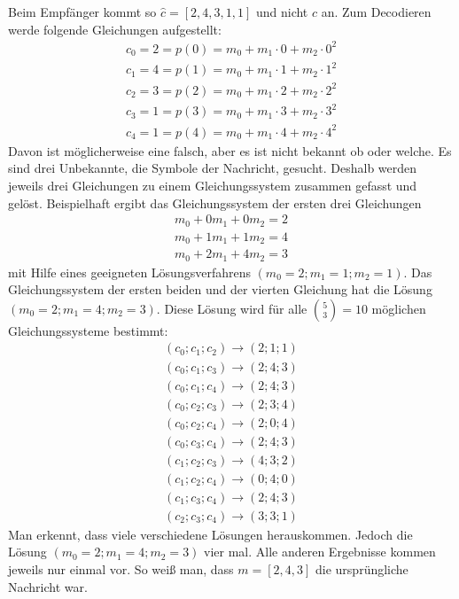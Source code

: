 Beim Empfänger kommt so $\hat{c}=[2,4,3,1,1]$ und nicht $c$ an.
Zum Decodieren werde folgende Gleichungen aufgestellt:
\begin{gather}
c_0=2=p(0)=m_0+m_1\cdot0+m_2\cdot0^2 \nonumber\\
c_1=4=p(1)=m_0+m_1\cdot1+m_2\cdot1^2 \nonumber\\
c_2=3=p(2)=m_0+m_1\cdot2+m_2\cdot2^2 \nonumber\\
c_3=1=p(3)=m_0+m_1\cdot3+m_2\cdot3^2 \nonumber\\
c_4=1=p(4)=m_0+m_1\cdot4+m_2\cdot4^2 \nonumber
\end{gather}
Davon ist möglicherweise eine falsch, aber es ist nicht bekannt ob oder welche.
Es sind drei Unbekannte, die Symbole der Nachricht, gesucht.
Deshalb werden jeweils drei Gleichungen zu einem Gleichungssystem zusammen gefasst und gelöst.
Beispielhaft ergibt das Gleichungssystem der ersten drei Gleichungen
\begin{gather}
m_0+0m_1+0m_2=2 \nonumber\\
m_0+1m_1+1m_2=4 \nonumber\\
m_0+2m_1+4m_2=3 \nonumber
\end{gather}
mit Hilfe eines geeigneten Lösungsverfahrens $(m_0=2; m_1=1; m_2=1)$.
Das Gleichungssystem der ersten beiden und der vierten Gleichung hat die Lösung $(m_0=2; m_1=4; m_2=3)$.
Diese Lösung wird für alle $\binom{5}{3}=10$ möglichen Gleichungssysteme bestimmt: 
\begin{gather}
(c_0; c_1; c_2)\rightarrow(2;1;1) \nonumber\\
(c_0; c_1; c_3)\rightarrow(2;4;3) \nonumber\\
(c_0; c_1; c_4)\rightarrow(2;4;3) \nonumber\\
(c_0; c_2; c_3)\rightarrow(2;3;4) \nonumber\\
(c_0; c_2; c_4)\rightarrow(2;0;4) \nonumber\\
(c_0; c_3; c_4)\rightarrow(2;4;3) \nonumber\\
(c_1; c_2; c_3)\rightarrow(4;3;2) \nonumber\\
(c_1; c_2; c_4)\rightarrow(0;4;0) \nonumber\\
(c_1; c_3; c_4)\rightarrow(2;4;3) \nonumber\\
(c_2; c_3; c_4)\rightarrow(3;3;1) \nonumber
\end{gather}
Man erkennt, dass viele verschiedene Lösungen herauskommen.
Jedoch die Lösung $(m_0=2; m_1=4; m_2=3)$ vier mal.
Alle anderen Ergebnisse kommen jeweils nur einmal vor.
So weiß man, dass $m=[2,4,3]$ die ursprüngliche Nachricht war.